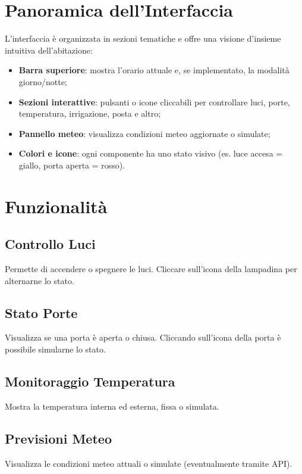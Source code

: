 \documentclass[a4paper,12pt]{article}
\begin{document}
\hspace{20 mm}

\section{Panoramica dell’Interfaccia}

L’interfaccia è organizzata in sezioni tematiche e offre una visione d’insieme intuitiva dell’abitazione:

\begin{itemize}
  \item \textbf{Barra superiore}: mostra l’orario attuale e, se implementato, la modalità giorno/notte;
  \item \textbf{Sezioni interattive}: pulsanti o icone cliccabili per controllare luci, porte, temperatura, irrigazione, posta e altro;
  \item \textbf{Pannello meteo}: visualizza condizioni meteo aggiornate o simulate;
  \item \textbf{Colori e icone}: ogni componente ha uno stato visivo (es. luce accesa = giallo, porta aperta = rosso).
\end{itemize}

\section{Funzionalità}

\subsection*{Controllo Luci}
Permette di accendere o spegnere le luci. Cliccare sull’icona della lampadina per alternarne lo stato.

\subsection*{Stato Porte}
Visualizza se una porta è aperta o chiusa. Cliccando sull’icona della porta è possibile simularne lo stato.

\subsection*{Monitoraggio Temperatura}
Mostra la temperatura interna ed esterna, fissa o simulata.

\subsection*{Previsioni Meteo}
Visualizza le condizioni meteo attuali o simulate (eventualmente tramite API).
\end{document}
